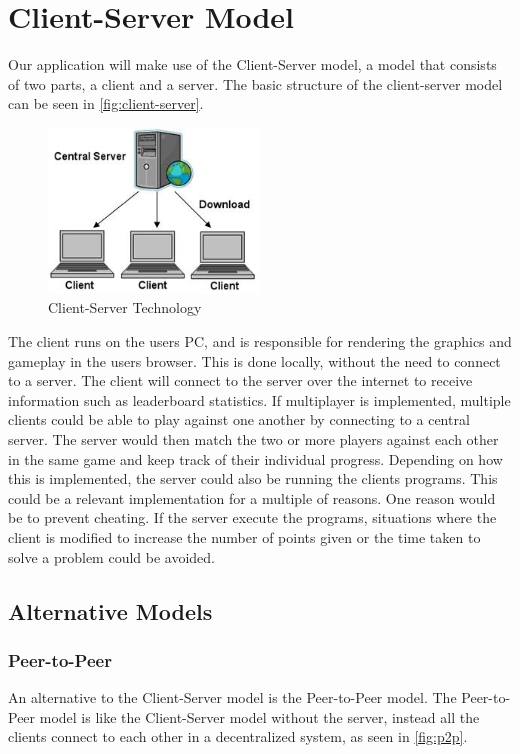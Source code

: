 \section{Client-Server Model}
Our application will make use of the Client-Server model, a model that consists of two parts, a client and a server. The basic structure of the client-server model can be seen in \autoref{fig:client-server}.


\begin{figure}[h]
  \centering
    \includegraphics[width=0.5\textwidth]{img/client_server.jpg}
  \caption{Client-Server Technology \citep{ClientServer}}
  \label{fig:client-server}
\end{figure}

The client runs on the users PC, and is responsible for rendering the graphics and gameplay in the users browser.
This is done locally, without the need to connect to a server. The client will connect to the server over the internet to receive information such as leaderboard statistics. If multiplayer is implemented, multiple clients could be able to play against one another by connecting to a central server. The server would then match the two or more players against each other in the same game and keep track of their individual progress. Depending on how this is implemented, the server could also be running the clients programs. This could be a relevant implementation for a multiple of reasons. One reason would be to prevent cheating. If the server execute the programs, situations where the client is modified to increase the number of points given or the time taken to solve a problem could be avoided.

\subsection{Alternative Models}

\subsubsection{Peer-to-Peer}
An alternative to the Client-Server model is the Peer-to-Peer model. The Peer-to-Peer model is like the Client-Server model without the server, instead all the clients connect to each other in a decentralized system, as seen in \autoref{fig:p2p}.

